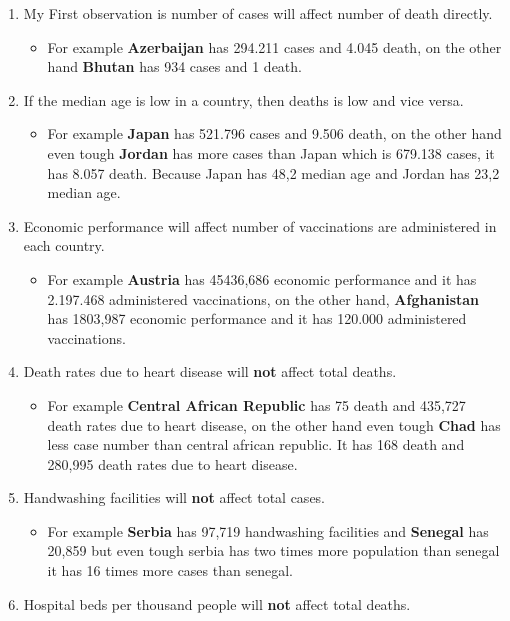 \documentclass[a4 paper]{article}
\numberwithin{equation}{section}
\newcommand{\0}{\mathbf{0}}
\begin{document}
\begin{itemize}
\begin{enumerate}
  \item My First observation is number of cases will affect number of death directly.
  \begin{itemize}
    \item For example \textbf{Azerbaijan} has 294.211 cases and 4.045 death, on the other hand \textbf{Bhutan} has 934 cases and 1 death.
  \end{itemize}
  \item If the median age is low in a country, then deaths is low and vice versa.
  \begin{itemize}
    \item For example \textbf{Japan} has 521.796 cases and 9.506 death, on the other hand even tough \textbf{Jordan} has more cases than Japan which is 679.138 cases, it has 8.057 death. Because Japan has 48,2 median age and Jordan has 23,2 median age.
  \end{itemize}
  \item Economic performance will affect number of vaccinations are administered in each country.
  \begin{itemize}
   \item For example \textbf{Austria} has 45436,686 economic performance and it has 2.197.468 administered vaccinations, on the other hand, \textbf{Afghanistan} has 1803,987 economic performance and it has 120.000 administered vaccinations.
  \end{itemize}
  \item Death rates due to heart disease will \textbf{not} affect total deaths.
  \begin{itemize}
    \item For example \textbf{Central African Republic} has 75 death and 435,727 death rates due to heart disease, on the other hand even tough \textbf{Chad} has less case number than central african republic. It has 168 death and 280,995 death rates due to heart disease.
  \end{itemize}
  \item Handwashing facilities will \textbf{not} affect total cases.
  	\begin{itemize}
    \item For example \textbf{Serbia} has 97,719 handwashing facilities and \textbf{Senegal} has 20,859 but even tough serbia has two times more population than senegal it has 16 times more cases than senegal.
  \end{itemize}
  \item Hospital beds per thousand people will \textbf{not} affect total deaths.

\end{enumerate}
\end{itemize}
\end{document}
